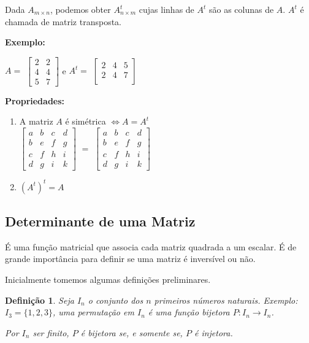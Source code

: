 \documentclass[oneside,a4paper,12pt]{article}
\newtheorem{definition}{Definição}[section]
\begin{document}
Dada $A_{m \times n}$, podemos obter $A_{n \times m}^{t}$ cujas linhas de $A^t$ são as colunas de $A$. $A^t$ é chamada de matriz transposta.

\textbf{Exemplo: }

$A =$
$
\left[
\begin{array}{cc}
2	&	2	\\
4	&	4	\\
5	&	7
\end{array}
\right]
$
e
$A^t=$
$
\left[
\begin{array}{ccc}
2	&	4	&	5	\\
2	&	4	&	7	\\
\end{array}
\right]
$

\textbf{Propriedades: }
\begin{enumerate}
	\item A matriz $A$ é simétrica $\Leftrightarrow A = A^t$ \\
	$
	\left[
	\begin{array}{cccc}
	a	&	b	&	c	&	d	\\
	b	&	e	&	f	&	g	\\
	c	&	f	&	h	&	i	\\
	d	&	g	&	i	&	k
	\end{array}
	\right]
	$
	$=$
		$
	\left[
	\begin{array}{cccc}
	a	&	b	&	c	&	d	\\
	b	&	e	&	f	&	g	\\
	c	&	f	&	h	&	i	\\
	d	&	g	&	i	&	k
	\end{array}
	\right]
	$
	\item $(A^t)^t = A$
\end{enumerate}


\subsection{Determinante de uma Matriz}

É uma função matricial que associa cada matriz quadrada a um escalar. É de grande importância para definir se uma matriz é inversível ou não.

Inicialmente tomemos algumas definições preliminares.

\begin{definition}
	Seja $I_n$ o conjunto dos $n$ primeiros números naturais. Exemplo: $I_3=\{1,2,3\}$, uma permutação em $I_n$ é uma função bijetora $P:I_n \rightarrow I_n$. 
	
	Por $I_n$ ser finito, $P$ é bijetora se, e somente se, $P$ é injetora.
\end{definition}
\end{document}
